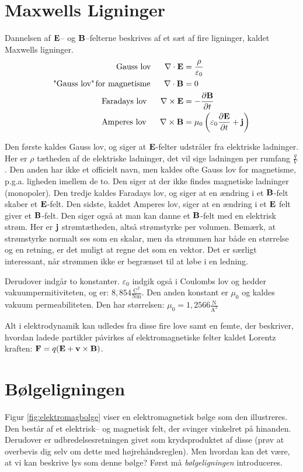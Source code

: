 \section{Maxwells Ligninger}
Dannelsen af $\mathbf{E}$-- og $\mathbf{B}$--felterne beskrives af et sæt af fire ligninger, kaldet Maxwells ligninger. 
\begin{align}
\text{Gauss lov}~~~~~\mathbf{\nabla}\cdot \mathbf{E} &= \frac{\rho}{\varepsilon_0}\\
\text{"Gauss lov"\,for magnetisme}~~~~~\mathbf{\nabla}\cdot \mathbf{B} &= 0\\
\text{Faradays lov}~~~~~\mathbf{\nabla}\times \mathbf{E} &= -\frac{\partial \mathbf{B}}{\partial t}\\
\text{Amperes lov}~~~~~\mathbf{\nabla}\times \mathbf{B} &= \mu_0\left(\varepsilon_0\frac{\partial \mathbf{E}}{\partial t} + \mathbf{j}\right)
\end{align}

Den første kaldes Gauss lov, og siger at $\mathbf{E}$-felter udstråler fra elektriske ladninger. Her er $\rho$ tætheden af de elektriske ladninger, det vil sige ladningen per rumfang $\frac{q}{V}$. 
Den anden har ikke et officielt navn, men kaldes ofte Gauss lov for magnetisme, p.g.a. ligheden imellem de to. Den siger at der ikke findes magnetiske ladninger (monopoler).
Den tredje kaldes Faradays lov, og siger at en ændring i et $\mathbf{B}$-felt skaber et $\mathbf{E}$-felt.
Den sidste, kaldet Amperes lov, siger at en ændring i et $\mathbf{E}$ felt giver et $\mathbf{B}$-felt. Den siger også at man kan danne et $\mathbf{B}$-felt med en elektrisk strøm. Her er $\mathbf{j}$ strømtætheden, altså  strømstyrke per volumen. Bemærk, at strømstyrke normalt ses som en skalar, men da strømmen har både en størrelse og en retning, er det muligt at regne det som en vektor. Det er særligt interessant, når strømmen ikke er begrænset til at løbe i en ledning.

Derudover indgår to konstanter. $\varepsilon_0$ indgik også i Coulombs lov og hedder vakuumpermitiviteten, og er: $8,854\frac{\mathrm{C^2}}{\mathrm{N m}}$. 
Den anden konstant er $\mu_0$ og kaldes vakuum permeabiliteten. Den har størrelsen: $\mu_0 = 1,2566 \mathrm{\frac{N}{A^2}}$

Alt i elektrodynamik kan udledes fra disse fire love samt en femte, der beskriver, hvordan ladede partikler påvirkes af elektromagnetiske felter kaldet Lorentz kraften: $\mathbf{F} = q(\mathbf{E}+\mathbf{v}\times\mathbf{B})$.

\section{Bølgeligningen}
Figur \ref{fig:elektromagbolge} viser en elektromagnetisk bølge som den illustreres. Den består af et elektrisk-- og magnetisk felt, der svinger vinkelret på hinanden. Derudover er udbredelsesretningen givet som krydsproduktet af disse (prøv at overbevis dig selv om dette med højrehåndsreglen).
Men hvordan kan det være, at vi kan beskrive lys som denne bølge?
Først må \emph{bølgeligningen} introduceres. 



